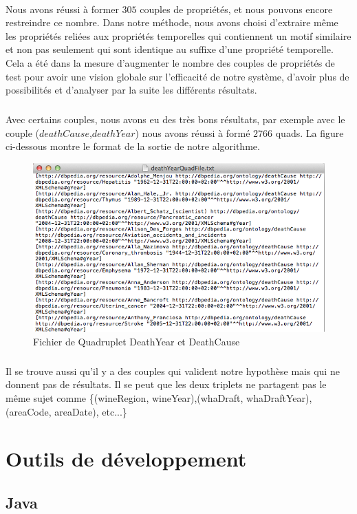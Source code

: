 \paragraph{}
Nous avons réussi à former $305$ couples de propriétés, et nous pouvons encore restreindre ce nombre. Dans notre méthode, nous avons choisi d'extraire même les propriétés reliées aux propriétés temporelles qui contiennent un motif similaire et non pas seulement qui sont identique au suffixe d'une propriété temporelle. Cela a été dans la mesure d'augmenter le nombre des couples de propriétés de test pour avoir une vision globale sur l'efficacité de notre système, d'avoir plus de possibilités et d'analyser par la suite les différents résultats. 
\subparagraph{}
Avec certains couples, nous avons eu des très bons résultats, par exemple avec le couple ($deathCause$,$deathYear$) nous avons réussi à formé $2766$ quads. La figure ci-dessous montre le format de la sortie de notre algorithme.
 \begin{figure}[H]
        \centering
                \includegraphics[width=13cm]{DeathYearCause.png}
               \caption{Fichier de Quadruplet DeathYear et DeathCause}
\end{figure}
\subparagraph{}
Il se trouve aussi qu'il y a des couples qui valident notre hypothèse mais qui ne donnent pas de résultats. Il se peut que les deux triplets ne partagent pas le même sujet comme \{(wineRegion, wineYear),(whaDraft, whaDraftYear),(areaCode, areaDate), etc...\}
\section{Outils de développement}
\subsection{ Java}
